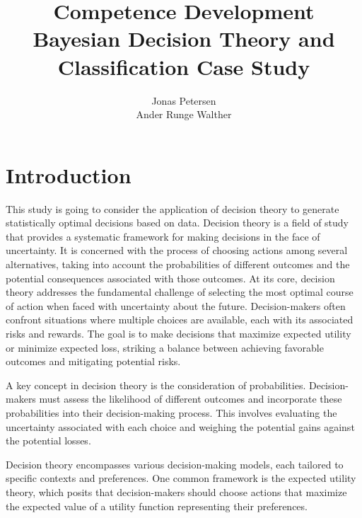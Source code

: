 \documentclass[a4paper,11pt, oneside]{article}
\theoremstyle{definition}
\begin{document}
	
	
	\begin{titlepage}
		\title{\small{Competence Development}\\
			\huge{Bayesian Decision Theory and Classification Case Study}
			}
		\author{Jonas Petersen\\ Ander Runge Walther}
		\date{} %
		\maketitle
		\thispagestyle{empty}
	\end{titlepage}
	
	\newpage
	\tableofcontents

	
	
	
	\thispagestyle{plain}
	

	\section{Introduction}
	This study is going to consider the application of decision theory to generate statistically optimal decisions based on data. Decision theory is a field of study that provides a systematic framework for making decisions in the face of uncertainty. It is concerned with the process of choosing actions among several alternatives, taking into account the probabilities of different outcomes and the potential consequences associated with those outcomes. At its core, decision theory addresses the fundamental challenge of selecting the most optimal course of action when faced with uncertainty about the future. Decision-makers often confront situations where multiple choices are available, each with its associated risks and rewards. The goal is to make decisions that maximize expected utility or minimize expected loss, striking a balance between achieving favorable outcomes and mitigating potential risks.
	
	A key concept in decision theory is the consideration of probabilities. Decision-makers must assess the likelihood of different outcomes and incorporate these probabilities into their decision-making process. This involves evaluating the uncertainty associated with each choice and weighing the potential gains against the potential losses.
	
	Decision theory encompasses various decision-making models, each tailored to specific contexts and preferences. One common framework is the expected utility theory, which posits that decision-makers should choose actions that maximize the expected value of a utility function representing their preferences.
	
\end{document}
